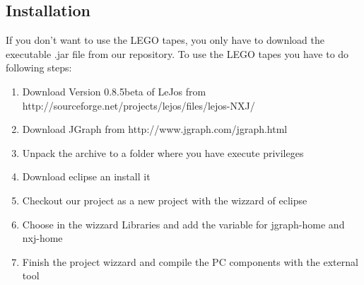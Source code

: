 \documentclass[%
  a4paper,%
  11pt,%
  blue,%
  hyperref	%
  ]{tubsartcl}
\begin{document}
\subsection{Installation}
\label{sec:installation}
If you don't want to use the LEGO tapes, you only have to download the executable .jar file from our repository.
To use the LEGO tapes you have to do following steps:
\begin{enumerate}
	\item Download Version 0.8.5beta of LeJos from http://sourceforge.net/projects/lejos/files/lejos-NXJ/
	\item Download JGraph from http://www.jgraph.com/jgraph.html
	\item Unpack the archive to a folder where you have execute privileges
	\item Download eclipse an install it
	\item Checkout our project as a new project with the wizzard of eclipse
	\item Choose in the wizzard Libraries and add the variable for jgraph-home and nxj-home
	\item Finish the project wizzard and compile the PC components with the external tool
\end{enumerate}


\newpage
\end{document}
